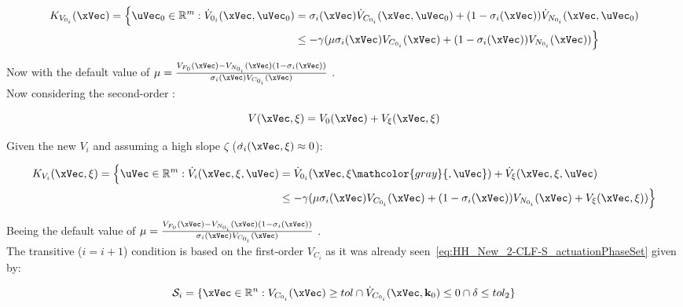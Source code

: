 \begin{align}
    K_{V_{0_i}}(\xVec) = \Bigl\{\uVec_0 \in \mathbb{R}^m: \dot{V}_{0_i}(\xVec, \uVec_0) &= \sigma_i(\xVec) \dot{V}_{C_{0_i}}(\xVec, \uVec_0)  + (1-\sigma_i(\xVec))\dot{V}_{N_{0_i}}(\xVec, \uVec_0) \notag \\
    &\leq -\gamma( \mu \sigma_i(\xVec) V_{C_{0_i}}(\xVec) + (1 - \sigma_i(\xVec))V_{N_{0_i}}(\xVec))\Bigr\}
    \label{eq:2-CLF-S_Constraint_multiple_waypoints}
\end{align}

Now with the default value of \(\mu =\frac{V_{F_{0}}(\xVec)- V_{N_{0_i}}(\xVec)(1 -\sigma_i(\xVec))}{\sigma_i(\xVec) V_{C_{0_i}}(\xVec)} \) .\\


Now considering the second-order :

\begin{equation}
    V(\xVec, \xi) = V_0(\xVec) + V_{\xi}(\xVec, \xi)
    \label{eq:HH_New_2-CLF-S_multiple_waypoints}
\end{equation}


Given the new  \(V_{i}\) and assuming a high slope \(\zeta\) (\(\dot{\sigma_i}(\xVec, \xi)\approx 0\)):

\begin{align}
    K_{V_{i}}(\xVec, \xi) = \Bigl\{\uVec \in \mathbb{R}^m: \dot{V}_{i}(\xVec, \xi,  \uVec) &= \dot{V}_{0_i}(\xVec, \xi \mathcolor{gray}{, \uVec}) + \dot{V}_{\xi}(\xVec, \xi, \uVec) \notag \\
    &\leq -\gamma( \mu \sigma_i(\xVec) V_{C_{0_i}}(\xVec) + (1 - \sigma_i(\xVec))V_{N_{0_i}}(\xVec) + V_{\xi}(\xVec, \xi))\Bigr\}
    \label{eq:HH_2-CLF-S_Constraint_multiple_waypoints}
\end{align}

Beeing the default value of \(\mu =\frac{V_{F_{0}}(\xVec)- V_{N_{0_i}}(\xVec)(1 -\sigma_i(\xVec))}{\sigma_i(\xVec) V_{C_{0_i}}(\xVec)} \) .\\


The transitive (\(i = i+1\)) condition is based on the first-order  \(V_{C_i}\) as it was already seen~\ref{eq:HH_New_2-CLF-S_actuationPhaseSet} given by:

\begin{equation}
    \mathcal{S}_i = \{\xVec \in \mathbb{R}^n: V_{C_{0_i}}(\xVec) \geq tol \cap \dot{V}_{C_{0_i}}(\xVec, \mathbf{k}_0) \leq 0 \cap \delta \leq tol_2 \}
    \label{eq:HH_New_2-CLF-S_actuationPhaseSet}
\end{equation}\\



